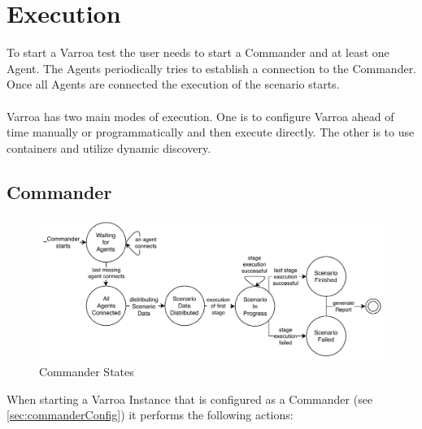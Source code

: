 \chapter{Execution}\label{sec:Execution}
To start a Varroa test the user needs to start a Commander and at least one Agent.
The Agents periodically tries to establish a connection to the Commander.
Once all Agents are connected the execution of the scenario starts.\\
\\
Varroa has two main modes of execution. One is to configure Varroa ahead of time manually or programmatically and then execute directly. The other is to use containers and utilize dynamic discovery.
\section{Commander}
\begin{figure}[H]
	\begin{center}
	\includegraphics[scale=0.9]{Resources/PDF/CommanderStates}
	\caption{Commander States}
	\label{pic:CommanderStates}
	\end{center}
\end{figure}
When starting a Varroa Instance that is configured as a Commander (see \ref{sec:commanderConfig}) it performs the following actions:
